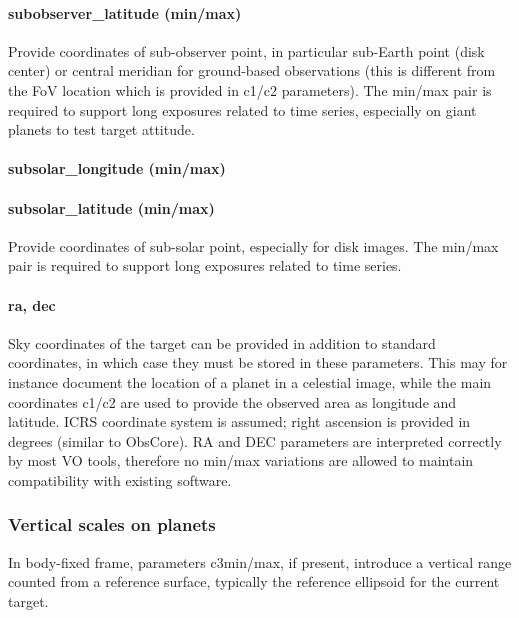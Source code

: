\documentclass[11pt,a4paper]{ivoa}
\begin{document}
\paragraph{subobserver\_latitude (min/max)}

Provide coordinates of sub-observer point, in particular sub-Earth point (disk center) or central meridian for ground-based observations (this is different from the FoV location which is provided in c1/c2 parameters). The min/max pair is required to support long exposures related to time series, especially on giant planets to test target attitude.

\paragraph{subsolar\_longitude (min/max)}

\paragraph{subsolar\_latitude (min/max)}

Provide coordinates of sub-solar point, especially for disk images. The min/max pair is required to support long exposures related to time series.

\paragraph{ra, dec}

Sky coordinates of the target can be provided in addition to standard coordinates, in which case they must be stored in these parameters. This may for instance document the location of a planet in a celestial image, while the main coordinates c1/c2 are used to provide the observed area as longitude and latitude. ICRS coordinate system is assumed; right ascension is provided in degrees (similar to ObsCore). RA and DEC parameters are interpreted correctly by most VO tools, therefore no min/max variations are allowed to maintain compatibility with existing software. 

\subsubsection{Vertical scales on planets}

In body-fixed frame, parameters c3min/max, if present, introduce a vertical range counted from a reference surface, typically the reference ellipsoid for the current target. \\
\end{document}
